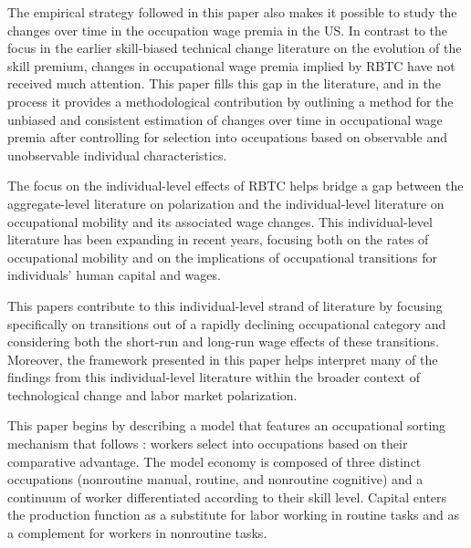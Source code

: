 \documentclass[12pt]{article}
\theoremstyle{definition}
\begin{document}
The empirical strategy followed in this paper also makes it possible to study the changes over time in the occupation wage premia in the US. In contrast to the focus in the earlier skill-biased technical change literature on the evolution of the skill premium, changes in occupational wage premia implied by RBTC have not received much attention. This paper fills this gap in the literature, and in the process it provides a methodological contribution by outlining a method for the unbiased and consistent estimation of changes over time in occupational wage premia after controlling for selection into occupations based on observable and unobservable individual characteristics. 

The focus on the individual-level effects of RBTC helps bridge a gap between the aggregate-level literature on polarization and the individual-level literature on occupational mobility and its associated wage changes. This individual-level literature has been expanding in recent years, focusing both on the rates of occupational mobility and on the implications of occupational transitions for individuals' human capital and wages. 

This papers contribute to this individual-level strand of literature by focusing specifically on transitions out of a rapidly declining occupational category and considering both the short-run and long-run wage effects of these transitions. Moreover, the framework presented in this paper helps interpret many of the findings from this individual-level literature within the broader context of technological change and labor market polarization. 

This paper begins by describing a model that features an occupational sorting mechanism that follows \citet{gibbonsComparativeAdvantageLearning2005}: workers select into occupations based on their comparative advantage. The model economy is composed of three distinct occupations (nonroutine manual, routine, and nonroutine cognitive) and a continuum of worker differentiated according to their skill level. Capital enters the production function as a substitute for labor working in routine tasks and as a complement for workers in nonroutine tasks. 
\end{document}
